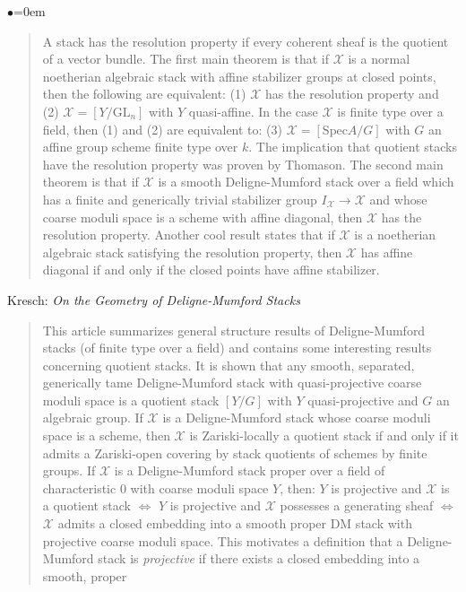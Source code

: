 \begin{list}{$\bullet$}{\leftmargin=0em}
\begin{quote}
A stack has the resolution property if every coherent sheaf is the quotient of 
a vector bundle. The first main theorem is that if $\mathcal{X}$ is a normal 
noetherian algebraic stack with affine stabilizer groups at closed points, then 
the following are equivalent: (1) $\mathcal{X}$ has the resolution property and 
(2) 
$\mathcal{X} = [Y/\text{GL}_n]$ with $Y$ quasi-affine. In the case 
$\mathcal{X}$ is finite type over 
a field, then (1) and (2) are equivalent to: (3) $\mathcal{X} = [\text{Spec} A 
/ G]$ with $G$ 
an affine group scheme finite type over $k$. The implication that quotient 
stacks have the resolution property was proven by Thomason.
The second main theorem is that if $\mathcal{X}$ is a smooth Deligne-Mumford 
stack over 
a field which has a finite and generically trivial stabilizer group 
$I_{\mathcal{X}} 
\to \mathcal{X}$ and whose coarse moduli space is a scheme with affine 
diagonal, then 
$\mathcal{X}$ has the resolution property. Another cool result states that if 
$\mathcal{X}$ is 
a noetherian algebraic stack satisfying the resolution property, then 
$\mathcal{X}$ has 
affine diagonal if and only if the closed points have affine stabilizer. 
\end{quote}
\smallskip
\item Kresch: \emph{On the Geometry of Deligne-Mumford Stacks} 
\cite{kresch_geometry}
\begin{quote}
This article summarizes general structure results of Deligne-Mumford 
stacks (of finite type over a field) and contains some interesting results 
concerning quotient stacks. It is shown that any smooth, separated, 
generically tame Deligne-Mumford stack with quasi-projective coarse moduli 
space is a quotient stack $[Y/G]$ with $Y$ quasi-projective and $G$ an 
algebraic group. If $\mathcal{X}$ is a Deligne-Mumford stack whose coarse 
moduli space 
is a scheme, then $\mathcal{X}$ is Zariski-locally a quotient stack if and only 
if it 
admits a Zariski-open covering by stack quotients of schemes by finite groups.
If $\mathcal{X}$ is a Deligne-Mumford stack proper over a field of 
characteristic 0 
with coarse moduli space $Y$, then: $Y$ is projective and $\mathcal{X}$ is a 
quotient 
stack $\iff$ $Y$ is projective and $\mathcal{X}$ possesses a generating sheaf 
$\iff$ 
$\mathcal{X}$ admits a closed embedding into a smooth proper DM stack with 
projective 
coarse moduli space. This motivates a definition that a Deligne-Mumford stack 
is \emph{projective} if there exists a closed embedding into a smooth, proper 

\end{quote}
\end{list}

